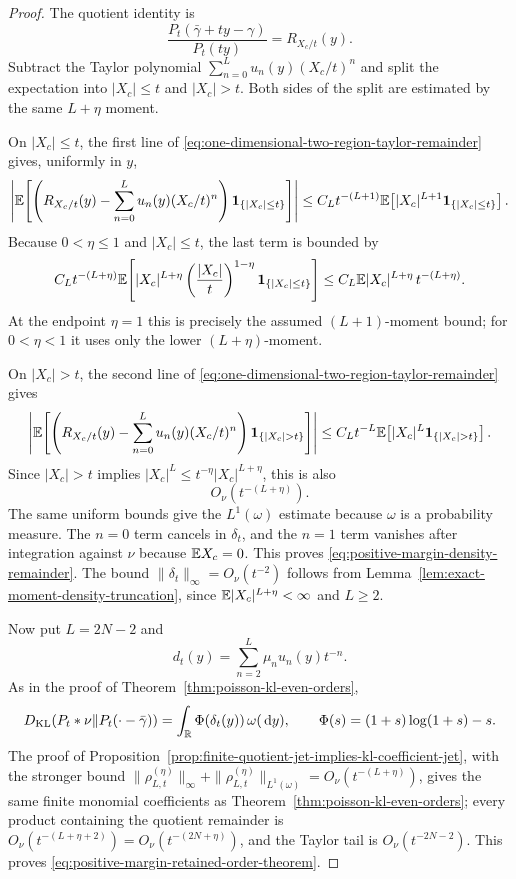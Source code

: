 \ifdefined\JFAArticleMain
{}
\else
\begin{proof}
The quotient identity is
\[
\frac{P_t(\bar{\gamma}+ty-\gamma)}{P_t(ty)}
=R_{X_c/t}(y).
\]
Subtract the Taylor polynomial
\(\sum_{n=0}^{L}u_n(y)(X_c/t)^n\) and split the expectation into
\(|X_c|\le t\) and \(|X_c|>t\).  Both sides of the split are estimated by the
same \(L+\eta\) moment.

On \(|X_c|\le t\), the first line of
\eqref{eq:one-dimensional-two-region-taylor-remainder} gives, uniformly in
\(y\),
\[
\left|
\mathbb{E}\!\left[
\left(R_{X_c/t}(y)-\sum_{n=0}^{L}u_n(y)(X_c/t)^n\right)
\mathbf1_{\{|X_c|\le t\}}
\right]\right|
\le
C_Lt^{-(L+1)}
\mathbb{E}\!\left[|X_c|^{L+1}\mathbf1_{\{|X_c|\le t\}}\right].
\]
Because \(0<\eta\le1\) and \(|X_c|\le t\), the last term is bounded by
\[
C_Lt^{-(L+\eta)}
\mathbb{E}\!\left[
|X_c|^{L+\eta}
\left(\frac{|X_c|}{t}\right)^{1-\eta}
\mathbf1_{\{|X_c|\le t\}}
\right]
\le
C_L\mathbb{E}|X_c|^{L+\eta}\,t^{-(L+\eta)} .
\]
At the endpoint \(\eta=1\) this is precisely the assumed
\((L+1)\)-moment bound; for \(0<\eta<1\) it uses only the lower
\((L+\eta)\)-moment.

On \(|X_c|>t\), the second line of
\eqref{eq:one-dimensional-two-region-taylor-remainder} gives
\[
\left|
\EE\!\left[
\left(R_{X_c/t}(y)-\sum_{n=0}^{L}u_n(y)(X_c/t)^n\right)
\mathbf1_{\{|X_c|>t\}}
\right]\right|
\le
C_Lt^{-L}\EE\!\left[|X_c|^L\mathbf1_{\{|X_c|>t\}}\right].
\]
Since \(|X_c|>t\) implies
\(|X_c|^L\le t^{-\eta}|X_c|^{L+\eta}\), this is also
\[
O_\nu(t^{-(L+\eta)}).
\]
The same uniform bounds give the \(L^1(\omega)\) estimate because
\(\omega\) is a probability measure.  The \(n=0\) term cancels in
\(\delta_t\), and the \(n=1\) term vanishes after integration against
\(\nu\) because \(\mathbb{E} X_c=0\).  This proves
\eqref{eq:positive-margin-density-remainder}.  The bound
\(\|\delta_t\|_\infty=O_\nu(t^{-2})\) follows from
Lemma~\ref{lem:exact-moment-density-truncation}, since
\(\mathbb{E}|X_c|^{L+\eta}<\infty\) and \(L\ge2\).

Now put \(L=2N-2\) and
\[
d_t(y)=\sum_{n=2}^{L}\mu_nu_n(y)t^{-n}.
\]
As in the proof of Theorem~\ref{thm:poisson-kl-even-orders},
\[
D_{\mathrm{KL}}(P_t*\nu\|P_t(\cdot-\bar{\gamma}))
=\int_{\mathbb{R}}\Phi(\delta_t(y))\,\omega(\,\mathrm{d} y),
\qquad
\Phi(s)=(1+s)\log(1+s)-s .
\]
The proof of
Proposition~\ref{prop:finite-quotient-jet-implies-kl-coefficient-jet}, with
the stronger bound
\(\|\rho_{L,t}^{(\eta)}\|_\infty+
\|\rho_{L,t}^{(\eta)}\|_{L^1(\omega)}
=O_\nu(t^{-(L+\eta)})\), gives the same finite monomial coefficients as
Theorem~\ref{thm:poisson-kl-even-orders}; every product containing the
quotient remainder is
\(O_\nu(t^{-(L+\eta+2)})=O_\nu(t^{-(2N+\eta)})\), and the Taylor tail is
\(O_\nu(t^{-2N-2})\).  This proves
\eqref{eq:positive-margin-retained-order-theorem}.
\end{proof}
\fi

